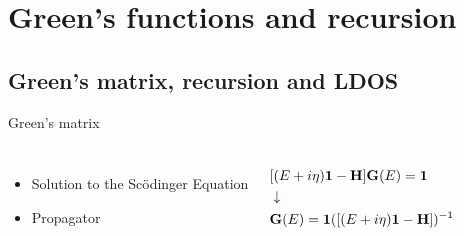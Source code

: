 \documentclass[hyperref={colorlinks=true,urlcolor=blue,linkcolor=.},aspectratio=1610,mathserif]{beamer}
\begin{document}
\section{Green's functions and recursion}
\subsection{Green's matrix, recursion and LDOS}

\begin{frame}{Green's matrix}
    \begin{center}
    \begin{columns}[c]
    \begin{itemize}
        \item Solution to the Sc\"{o}dinger Equation
        \item Propagator
    \end{itemize}
        \begin{align*}
            &[(E+i\eta)\vb{1}-\vb{H}]\vb{G}(E)=\vb{1}\\
            &\downarrow\\
            &\vb{G}(E)=\vb{1}([(E+i\eta)\vb{1}-\vb{H}])^{-1}
        \end{align*}
    \end{columns}
    \end{center}
\end{frame}
\end{document}
